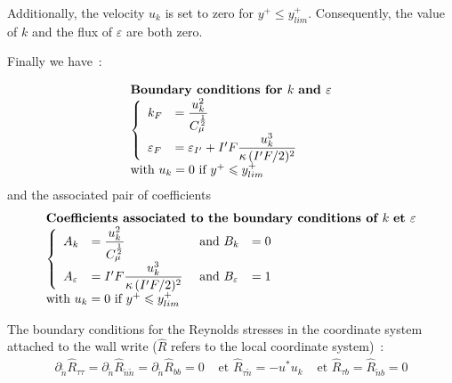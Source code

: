 Additionally, the velocity $u_k$ is set to zero for $y^+\leqslant y^+_{lim}$.
Consequently, the value of $k$ and the flux of $\varepsilon$ are both zero.

Finally we have~:

\begin{equation}
\begin{array}{l}
\text{\bf Boundary conditions for } k \text { \bf and } \varepsilon \\
\left\{\begin{array}{ll}
k_F&= \displaystyle\frac{u_k^2}{C_\mu^\frac{1}{2}}\\
\varepsilon_F&=\varepsilon_{I'}+I'F\displaystyle\frac{ u_k^3}{\kappa\, (I'F/2)^2}
\end{array}\right. \\
\text{with } u_k = 0 \text { if } y^+\leqslant y^+_{lim}
\end{array}
\end{equation}
and the associated pair of coefficients
\begin{equation}
\begin{array}{l}
\text{\bf Coefficients associated to the boundary conditions of }
k \text { \bf et } \varepsilon \\
\left\{\begin{array}{llll}
A_k&= \displaystyle\frac{u_k^2}{C_\mu^\frac{1}{2}} &\text{ and } B_k&= 0 \\
A_\varepsilon&=I'F\displaystyle\frac{ u_k^3}{\kappa\, (I'F/2)^2}&\text{ and } B_\varepsilon&= 1
\end{array}\right.\\
\text{with } u_k = 0 \text { if } y^+\leqslant y^+_{lim}
\end{array}
\end{equation}








The boundary conditions for the Reynolds stresses in the coordinate system 
attached to the wall write ($\hat R$ refers to the local coordinate system)~:
\begin{equation}
\begin{array}{lll}
\partial_{\tilde{n}} \hat R_{\tau\tau} = \partial_{\tilde{n}} \hat R_{\tilde{n}\tilde{n}}=\partial_{\tilde{n}} \hat R_{bb}=0  &
\text { et } \hat R_{\tau\tilde{n}} = -u^*u_k  &\text { et  } \hat R_{\tau b} = \hat R_{\tilde{n} b}
= 0
\end{array}
\end{equation}


